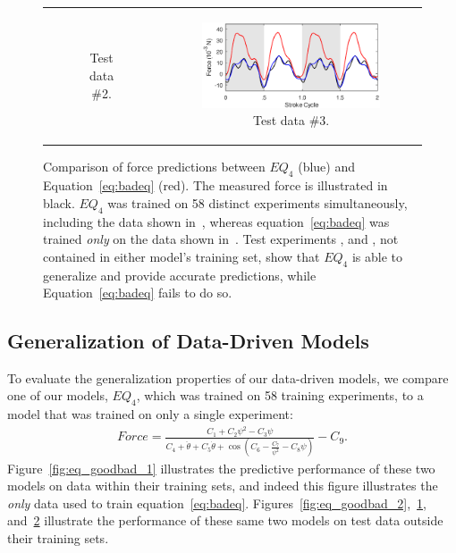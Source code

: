 \documentclass{article}
\begin{document}
\begin{figure}[ht]
\begin{tabular}{cc}
\begin{subfigure}{0.48\textwidth}
\caption{\label{fig:eq_goodbad_3} Test data \#2.}
\end{subfigure} &
\begin{subfigure}{0.48\textwidth}
\centering
\includegraphics[width=\textwidth]{figures/eq_goodbad_4}
\caption{\label{fig:eq_goodbad_4} Test data \#3.}
\end{subfigure}
\end{tabular}
\caption{Comparison of force predictions between $EQ_4$ (blue) and
  Equation~\eqref{eq:badeq} (red). The measured force is illustrated in black.
  $EQ_4$ was trained on 58 distinct experiments simultaneously, including the
  data shown in~, whereas equation~\eqref{eq:badeq} was
  trained \emph{only} on the data shown in~. Test
  experiments ,  and
  , not contained in either model's training set, show
  that $EQ_4$ is able to generalize and provide accurate predictions, while
  Equation~\eqref{eq:badeq} fails to do so.}
\label{fig:eq_goodbad}
\end{figure}

\subsection*{Generalization of Data-Driven Models}
To evaluate the generalization properties of our data-driven models, we compare
one of our models, $EQ_4$, which was trained on 58 training experiments, to a
model that was trained on only a single experiment:
\begin{align}
 Force = \frac{C_1 + C_2\psi^2 - C_3\psi}{C_4 + \ddot{\theta} + C_5\dot{\theta} + \cos(C_6 -
  \frac{C_7}{\psi^2} - C_8\psi)} - C_9.
\label{eq:badeq}
\end{align}
Figure~\ref{fig:eq_goodbad_1} illustrates the predictive performance of these
two models on data within their training sets, and indeed this figure
illustrates the \emph{only} data used to train equation~\eqref{eq:badeq}.
Figures~\ref{fig:eq_goodbad_2},~\ref{fig:eq_goodbad_3},
and~\ref{fig:eq_goodbad_4} illustrate the performance of these same two models
on test data outside their training sets.
\end{document}
